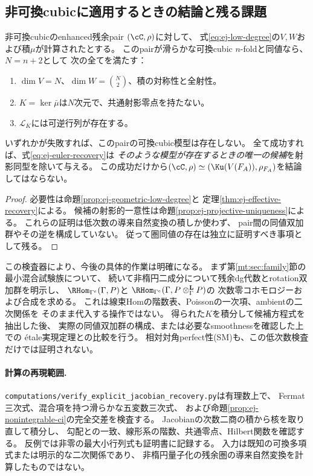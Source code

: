\subsection{非可換cubicに適用するときの結論と残る課題}

\begin{corollary}[唯一の可換候補を抽出する検査器]
\label{cor:ej-candidate}
非可換cubicのenhanced残余pair $(\cC,\rho)$に対して、
式\eqref{eq:ej-low-degree}の$V,W$および積$\mu$が計算されたとする。
このpairが滑らかな可換cubic $n$-foldと同値なら、$N=n+2$として
次の全てを満たす：
\begin{enumerate}
 \item $\dim V=N$、$\dim W=\binom N2$、積の対称性と全射性。
 \item $K=\ker\bar\mu$は$N$次元で、共通射影零点を持たない。
 \item $\mathcal L_K$には可逆行列が存在する。
\end{enumerate}
いずれかが失敗すれば、このpairの可換cubic模型は存在しない。
全て成功すれば、式\eqref{eq:ej-euler-recovery}は
\emph{そのような模型が存在するときの唯一の候補}を射影同型を除いて与える。
この成功だけから$(\cC,\rho)\simeq(\Ku(V(F_A)),\rho_{F_A})$を結論してはならない。
\end{corollary}
\begin{proof}
必要性は命題\ref{prop:ej-geometric-low-degree}と
定理\ref{thm:ej-effective-recovery}による。
候補の射影的一意性は命題\ref{prop:ej-projective-uniqueness}による。
これらの証明は低次数の導来自然変換の積しか使わず、
pair間の同値双加群やその逆を構成していない。
従って圏同値の存在は独立に証明すべき事項として残る。
\end{proof}

この検査器により、今後の具体的作業は明確になる。
まず第\ref{mt:sec:family}節の最小混合試験族について、
続いて非楕円二成分について残余dg代数とrotation双加群を明示し、
$\RHom_{\Gamma^e}(\Gamma,P)$と
$\RHom_{\Gamma^e}(\Gamma,P\otimes_\Gamma^{\mathbf L}P)$の
次数零コホモロジーおよび合成を求める。
これは線束Homの階数表、Poissonの一次項、ambientの二次関係を
そのまま代入する操作ではない。
得られた$K$を積分して候補方程式を抽出した後、
実際の同値双加群の構成、または必要なsmoothnessを確認した上での
\'etale実現定理との比較を行う。
相対対角perfect性(SM)も、この低次数検査だけでは証明されない。

\paragraph{計算の再現範囲.}
\texttt{computations/verify\_explicit\_jacobian\_recovery.py}は有理数上で、
Fermat三次式、混合項を持つ滑らかな五変数三次式、
および命題\ref{prop:ej-nonintegrable-ci}の完全交差を検査する。
Jacobianの次数二商の積から核を取り直して積分し、
勾配との一致、線形系の階数、共通零点、Hilbert関数を確認する。
反例では非零の最大小行列式も証明書に記録する。
入力は既知の可換多項式または明示的な二次関係であり、
非楕円量子化の残余圏の導来自然変換を計算したものではない。
